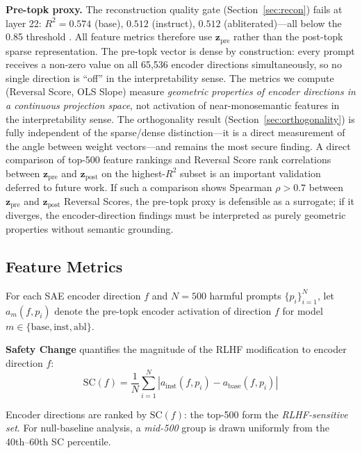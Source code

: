 \documentclass[11pt,letterpaper]{article}
\begin{document}
\noindent\textbf{Pre-topk proxy.} The reconstruction quality gate (Section~\ref{sec:recon}) fails
at layer 22: $R^2 = 0.574$ (base), $0.512$ (instruct), $0.512$ (abliterated)---all below the 0.85
threshold \citep{Li2025}. All feature metrics therefore use $\mathbf{z}_{\text{pre}}$ rather than the
post-topk sparse representation. The pre-topk vector is dense by construction: every prompt receives
a non-zero value on all 65,536 encoder directions simultaneously, so no single direction is ``off''
in the interpretability sense. The metrics we compute (Reversal Score, OLS Slope) measure
\emph{geometric properties of encoder directions in a continuous projection space}, not activation of
near-monosemantic features in the interpretability sense. The orthogonality result
(Section~\ref{sec:orthogonality}) is fully independent of the sparse/dense distinction---it is a
direct measurement of the angle between weight vectors---and remains the most secure finding. A direct
comparison of top-500 feature rankings and Reversal Score rank correlations between $\mathbf{z}_{\text{pre}}$
and $\mathbf{z}_{\text{post}}$ on the highest-$R^2$ subset is an important validation deferred to
future work. If such a comparison shows Spearman $\rho > 0.7$ between $\mathbf{z}_{\text{pre}}$ and
$\mathbf{z}_{\text{post}}$ Reversal Scores, the pre-topk proxy is defensible as a surrogate; if it
diverges, the encoder-direction findings must be interpreted as purely geometric properties without
semantic grounding.

\subsection{Feature Metrics}
\label{sec:metrics}

For each SAE encoder direction $f$ and $N = 500$ harmful prompts $\{p_i\}_{i=1}^N$, let
$a_m(f, p_i)$ denote the pre-topk encoder activation of direction $f$ for model
$m \in \{\text{base}, \text{inst}, \text{abl}\}$.

\noindent\textbf{Safety Change} quantifies the magnitude of the RLHF modification to encoder
direction $f$:
\begin{equation}
  \text{SC}(f) = \frac{1}{N}\sum_{i=1}^N |a_{\text{inst}}(f, p_i) - a_{\text{base}}(f, p_i)|
\end{equation}

Encoder directions are ranked by $\text{SC}(f)$: the top-500 form the \emph{RLHF-sensitive set}.
For null-baseline analysis, a \emph{mid-500} group is drawn uniformly from the 40th--60th SC
percentile.
\end{document}
